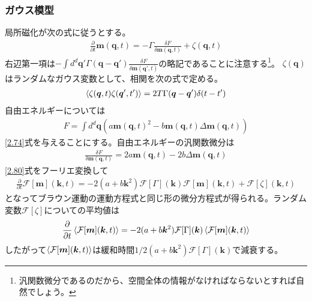 \documentclass[autodetect-engine,dvipdfmx-if-dvi,ja=standard]{bxjsarticle}
\theoremstyle{break}
\begin{document}
            \subsubsection{ガウス模型}
                局所磁化が次の式に従うとする。
                \begin{align}
                    \frac{\partial}{\partial t}\bm{m}(\bm{q},t)=-\Gamma \frac{\delta F}{\delta \bm{m}(\bm{q},t)}+\zeta (\bm{q},t)
                    \label{2.80}
                \end{align}
                右辺第一項は$-\int d^d \bm{q}'\Gamma(\bm{q}-\bm{q}')\frac{\delta F}{\delta \bm{m}(\bm{q}',t)}$の略記であることに注意する\footnote{汎関数微分であるのだから、空間全体の情報がなければならないとすれば自然でしょう。}。
                $\zeta(\bm{q})$はランダムなガウス変数として、相関を次の式で定める。
                \begin{align}
                    \braket{\zeta(\bm{q},t)\zeta(\bm{q}',t')}=2T\Gamma (\bm{q}-\bm{q}')\delta(t-t')
                \end{align}
                自由エネルギーについては
                \begin{align}
                    F=\int d^d\bm{q}(a\bm{m}(\bm{q},t)^2 -b\bm{m}(\bm{q},t)\Delta \bm{m}(\bm{q},t))
                \end{align}
                \fi
                \eqref{2.74}式を与えることにする。自由エネルギーの汎関数微分は
                \begin{align}
                    \frac{\delta F}{\delta \bm{m}(\bm{q},t)}=2a\bm{m}(\bm{q},t)-2b\Delta \bm{m}(\bm{q},t)
                \end{align}
                \eqref{2.80}式をフーリエ変換して
                \begin{align}
                    \frac{\partial}{\partial t}\mathcal{F}[\bm{m}](\bm{k},t)=-2(a+b\bm{k}^2 )\mathcal{F}[\Gamma](\bm{k})\mathcal{F}[\bm{m}](\bm{k},t)+\mathcal{F}[\zeta](\bm{k},t)
                \end{align}
                となってブラウン運動の運動方程式と同じ形の微分方程式が得られる。ランダム変数$\mathcal{F}[\zeta]$についての平均値は
                \begin{align}
                    \frac{\partial}{\partial t}\braket{\mathcal{F}[\bm{m}](\bm{k},t)}=-2(a+b\bm{k}^2 )\mathcal{F}[\Gamma](\bm{k})\braket{\mathcal{F}[\bm{m}](\bm{k},t)}
                \end{align}
                したがって$\braket{\mathcal{F}[\bm{m}](\bm{k},t)}$は緩和時間$1/2(a+b\bm{k}^2 )\mathcal{F}[\Gamma](\bm{k})$で減衰する。
\end{document}
